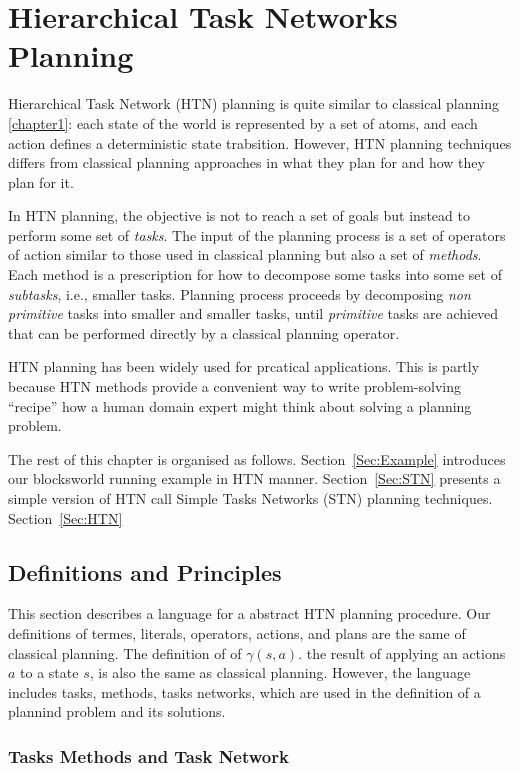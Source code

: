 \chapter{Hierarchical Task Networks Planning}

Hierarchical Task Network (HTN) planning is quite similar to classical planning \autoref{chapter1}: each state of the world is represented by a set of atoms, and each action defines a deterministic state trabsition. However, HTN planning techniques differs from classical planning approaches in what they plan for and how they plan for it. 

In HTN planning, the objective is not to reach a set of goals but instead to perform some set of {\em tasks}. The input of the planning process is a set of operators of action similar to those used in classical planning but also a set of {\em methods}. Each method is a prescription for how to decompose some tasks into some set of {\em subtasks}, i.e., smaller tasks. Planning process proceeds by decomposing {\em non primitive} tasks into smaller and smaller tasks, until {\em primitive} tasks are achieved that can be performed directly by a classical planning operator.

HTN planning has been widely used for prcatical applications. This is partly because HTN methods provide a convenient way to write problem-solving ``recipe'' how a human domain expert might think about solving a planning problem.

The rest of this chapter is organised as follows. Section~\ref{Sec:Example} introduces our blocksworld running example in HTN manner. Section~\ref{Sec:STN} presents a simple version of HTN call Simple Tasks Networks (STN) planning techniques. Section~\ref{Sec:HTN} 

\section{Definitions and Principles}
\label{Sec:HNT}

This section describes a language for a abstract HTN planning procedure. Our definitions of termes, literals, operators, actions, and plans are the same of classical planning. The definition of of $\gamma(s,a)$. the result of applying an actions $a$ to a state $s$, is also the same as classical planning. However, the language includes tasks, methods, tasks networks, which are used in the definition of a plannind problem and its solutions.

\subsection{Tasks Methods and Task Network}

